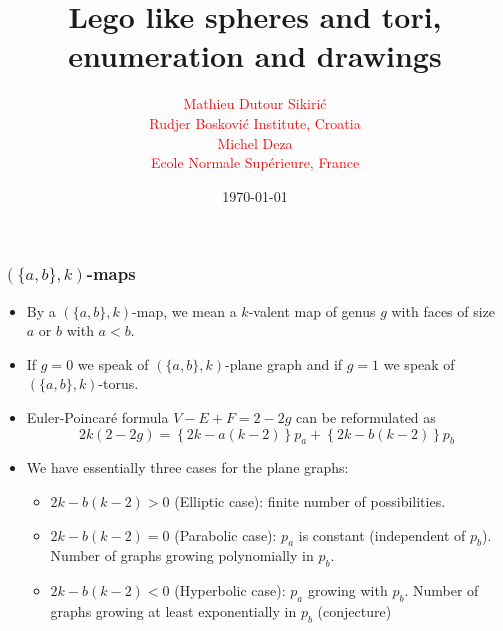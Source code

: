 \documentclass{beamer}
\begin{document}
\title{Lego like spheres and tori, enumeration and drawings}
\author{
{\small
\begin{multicols}{2}
\textcolor{red}{\large Mathieu Dutour Sikiri\'c}\\[2mm]
\textcolor{red}{Rudjer Boskovi\'c Institute, Croatia}\\[2mm]
\textcolor{red}{\large Michel Deza}\\[2mm]
\textcolor{red}{Ecole Normale Sup\'erieure, France}
\end{multicols}
}
}
\date{\today} 
\frame{\titlepage} 







\begin{frame}
  \frametitle{$(\{a,b\},k)$-maps}

\begin{itemize}
\item By a $(\{a,b\},k)$-map, we mean a $k$-valent map of genus $g$ with faces of size $a$ or $b$ with $a<b$.
\item If $g=0$ we speak of $(\{a,b\},k)$-plane graph and if $g=1$ we speak of $(\{a,b\},k)$-torus.
\item Euler-Poincar\'e formula $V-E+F=2-2g$ can be reformulated as
  \begin{equation*}
  2k(2-2g) = \left\lbrace 2k - a(k-2)\right\rbrace p_a + \left\lbrace 2k - b(k-2)\right\rbrace p_b
  \end{equation*}
\item We have essentially three cases for the plane graphs:
\begin{itemize}
\item $2k - b(k-2) > 0$ (Elliptic case): finite number of possibilities.
\item $2k - b(k-2) = 0$ (Parabolic case): $p_a$ is constant (independent of $p_b$). Number of graphs growing polynomially in $p_b$.
\item $2k - b(k-2) < 0$ (Hyperbolic case): $p_a$ growing with $p_b$. Number of graphs growing at least exponentially in $p_b$ (conjecture)
\end{itemize}
  
\end{itemize}
\end{frame}
  
\end{document}
